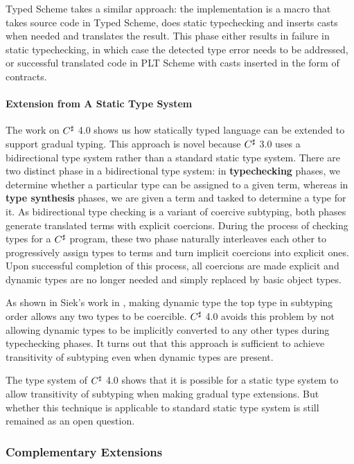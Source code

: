 Typed Scheme takes a similar approach: the implementation is a macro
that takes source code in Typed Scheme, does static typechecking and 
inserts casts when needed and translates the result.
This phase either results in failure in static typechecking, in
which case the detected type error needs to be addressed,
or successful translated code in PLT Scheme with casts inserted
in the form of contracts.

\paragraph{Extension from A Static Type System}

The work on $C^\sharp$ 4.0 shows us how statically typed language can be extended
to support gradual typing.
This approach is novel because $C^\sharp$ 3.0 uses a bidirectional type system \cite{pierce2000local}
rather than a standard static type system.
There are two distinct phase in a bidirectional type system:
in \textbf{typechecking} phases, we determine whether a particular type can be
assigned to a given term, whereas in \textbf{type synthesis} phases,
we are given a term and tasked to determine a type for it.
As bidirectional type checking is a variant of coercive subtyping\cite{breazu1991inheritance},
both phases generate translated terms with explicit coercions.
During the process of checking types for a $C^\sharp$ program,
these two phase naturally interleaves each other to progressively
assign types to terms and turn implicit coercions into explicit ones.
Upon successful completion of this process, all coercions are made
explicit and dynamic types are no longer needed and simply replaced by basic object types.

As shown in Siek's work in \cite{siek2007gradual},
making dynamic type the top type in subtyping order allows any two types to
be coercible. $C^\sharp$ 4.0 avoids this problem by
not allowing dynamic types to be implicitly converted to any other types
during typechecking phases.
It turns out that this approach is sufficient to achieve
transitivity of subtyping
even when dynamic types are present.

The type system of $C^\sharp$ 4.0 shows that it is possible for a
static type system to allow transitivity of subtyping when making gradual type extensions.
But whether this technique is applicable to standard static type system is still remained
as an open question.

\subsubsection{Complementary Extensions}

